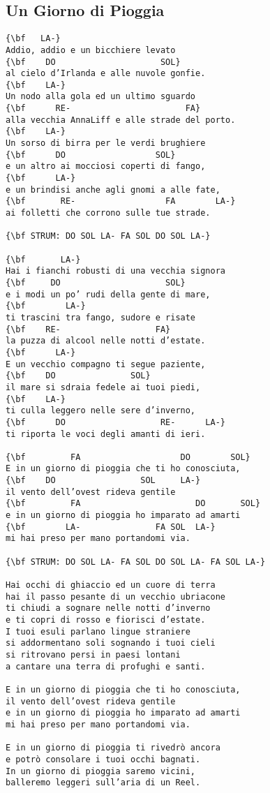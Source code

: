 \documentclass[a4paper]{article}
\begin{document}
\subsection{Un Giorno di Pioggia} %
\label{sub:Un Giorno Di Pioggi}
\begin{Verbatim}[commandchars=\\\{\}]
{\bf   LA-}
Addio, addio e un bicchiere levato
{\bf    DO                     SOL}
al cielo d’Irlanda e alle nuvole gonfie.
{\bf    LA-}
Un nodo alla gola ed un ultimo sguardo
{\bf      RE-                       FA}
alla vecchia AnnaLiff e alle strade del porto.
{\bf    LA-}
Un sorso di birra per le verdi brughiere
{\bf      DO                  SOL}
e un altro ai mocciosi coperti di fango,
{\bf      LA-}
e un brindisi anche agli gnomi a alle fate,
{\bf       RE-                  FA        LA-}
ai folletti che corrono sulle tue strade.

{\bf STRUM: DO SOL LA- FA SOL DO SOL LA-}

{\bf       LA-}
Hai i fianchi robusti di una vecchia signora
{\bf     DO                     SOL}
e i modi un po’ rudi della gente di mare,
{\bf        LA-}
ti trascini tra fango, sudore e risate
{\bf    RE-                   FA}
la puzza di alcool nelle notti d’estate.
{\bf      LA-}
E un vecchio compagno ti segue paziente,
{\bf    DO               SOL}
il mare si sdraia fedele ai tuoi piedi,
{\bf    LA-}
ti culla leggero nelle sere d’inverno,
{\bf      DO                   RE-      LA-}
ti riporta le voci degli amanti di ieri.

{\bf         FA                    DO        SOL}
E in un giorno di pioggia che ti ho conosciuta,
{\bf    DO                 SOL     LA-}
il vento dell’ovest rideva gentile
{\bf         FA                       DO       SOL}
e in un giorno di pioggia ho imparato ad amarti
{\bf        LA-               FA SOL  LA-}
mi hai preso per mano portandomi via.

{\bf STRUM: DO SOL LA- FA SOL DO SOL LA- FA SOL LA-}

Hai occhi di ghiaccio ed un cuore di terra
hai il passo pesante di un vecchio ubriacone
ti chiudi a sognare nelle notti d’inverno
e ti copri di rosso e fiorisci d’estate.
I tuoi esuli parlano lingue straniere
si addormentano soli sognando i tuoi cieli
si ritrovano persi in paesi lontani
a cantare una terra di profughi e santi.

E in un giorno di pioggia che ti ho conosciuta,
il vento dell’ovest rideva gentile
e in un giorno di pioggia ho imparato ad amarti
mi hai preso per mano portandomi via.

E in un giorno di pioggia ti rivedrò ancora
e potrò consolare i tuoi occhi bagnati.
In un giorno di pioggia saremo vicini,
balleremo leggeri sull’aria di un Reel.
\end{Verbatim}
\end{document}

